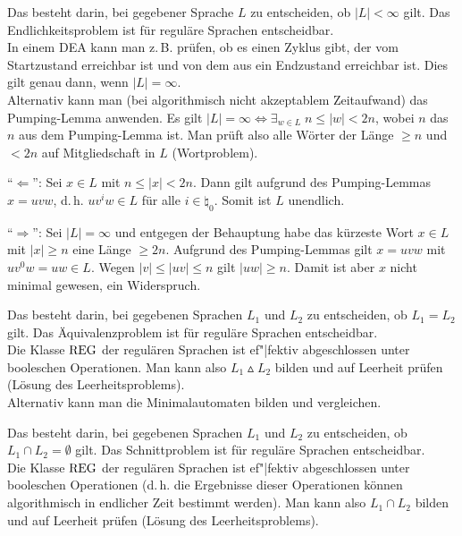 \begin{Bem}
    Das  besteht darin, bei gegebener Sprache $L$
    zu entscheiden, ob $|L| < \infty$ gilt.
    Das Endlichkeitsproblem ist für reguläre Sprachen entscheidbar.\\
    In einem DEA kann man z.\,B. prüfen, ob es einen Zyklus gibt, der
    vom Startzustand erreichbar ist und von dem aus ein Endzustand erreichbar
    ist.
    Dies gilt genau dann, wenn $|L| = \infty$.\\
    Alternativ kann man (bei algorithmisch nicht akzeptablem Zeitaufwand)
    das Pumping-Lemma anwenden.
    Es gilt $|L| = \infty \iff \exists_{w \in L}\; n \le |w| < 2n$, wobei
    $n$ das $n$ aus dem Pumping-Lemma ist.
    Man prüft also alle Wörter der Länge $\ge n$ und $< 2n$ auf Mitgliedschaft
    in $L$ (Wortproblem).
\end{Bem}

\begin{Beweis}
    "`$\Leftarrow$"':
    Sei $x \in L$ mit $n \le |x| < 2n$.
    Dann gilt aufgrund des Pumping-Lemmas $x = uvw$, d.\,h.
    $uv^i w \in L$ für alle $i \in \natural_0$.
    Somit ist $L$ unendlich.

    "`$\Rightarrow$"':
    Sei $|L| = \infty$ und entgegen der Behauptung habe das kürzeste Wort
    $x \in L$ mit $|x| \ge n$ eine Länge $\ge 2n$.
    Aufgrund des Pumping-Lemmas gilt $x = uvw$ mit $uv^0 w = uw \in L$.
    Wegen $|v| \le |uv| \le n$ gilt $|uw| \ge n$.
    Damit ist aber $x$ nicht minimal gewesen, ein Widerspruch.
\end{Beweis}

\linie

\begin{Bem}
    Das  besteht darin, bei gegebenen Sprachen $L_1$
    und $L_2$ zu entscheiden, ob $L_1 = L_2$ gilt.
    Das Äquivalenzproblem ist für reguläre Sprachen entscheidbar.\\
    Die Klasse $\text{REG}$ der regulären Sprachen ist ef"|fektiv abgeschlossen
    unter booleschen Operationen.
    Man kann also $L_1 \vartriangle L_2$ bilden und auf Leerheit prüfen
    (Lösung des Leerheitsproblems).\\
    Alternativ kann man die Minimalautomaten bilden und vergleichen.
\end{Bem}

\linie

\begin{Bem}
    Das  besteht darin, bei gegebenen Sprachen $L_1$
    und $L_2$ zu entscheiden, ob $L_1 \cap L_2 = \emptyset$ gilt.
    Das Schnittproblem ist für reguläre Sprachen entscheidbar.\\
    Die Klasse $\text{REG}$ der regulären Sprachen ist ef"|fektiv abgeschlossen
    unter booleschen Operationen
    (d.\,h. die Ergebnisse dieser Operationen können algorithmisch in
    endlicher Zeit bestimmt werden).
    Man kann also $L_1 \cap L_2$ bilden und auf Leerheit prüfen
    (Lösung des Leerheitsproblems).
\end{Bem}

\pagebreak
